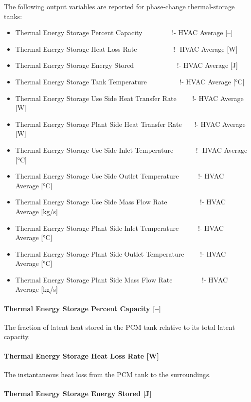 The following output variables are reported for phase‐change thermal‐storage tanks:

\begin{itemize}
\item
  Thermal Energy Storage Percent Capacity~~~~~~~~ !- HVAC Average [–]
\item
  Thermal Energy Storage Heat Loss Rate~~~~~~~~~~ !- HVAC Average [W]
\item
  Thermal Energy Storage Energy Stored~~~~~~~~~~~~ !- HVAC Average [J]
\item
  Thermal Energy Storage Tank Temperature~~~~~~~~~ !- HVAC Average [°C]
\item
  Thermal Energy Storage Use Side Heat Transfer Rate~~~~ !- HVAC Average [W]
\item
  Thermal Energy Storage Plant Side Heat Transfer Rate~~~ !- HVAC Average [W]
\item
  Thermal Energy Storage Use Side Inlet Temperature~~~~~~ !- HVAC Average [°C]
\item
  Thermal Energy Storage Use Side Outlet Temperature~~~~~ !- HVAC Average [°C]
\item
  Thermal Energy Storage Use Side Mass Flow Rate~~~~~~~~~ !- HVAC Average [kg/s]
\item
  Thermal Energy Storage Plant Side Inlet Temperature~~~~~ !- HVAC Average [°C]
\item
  Thermal Energy Storage Plant Side Outlet Temperature~~~~ !- HVAC Average [°C]
\item
  Thermal Energy Storage Plant Side Mass Flow Rate~~~~~~~~ !- HVAC Average [kg/s]
\end{itemize}

\paragraph{Thermal Energy Storage Percent Capacity [–]}\label{pcmstorage-percent-capacity}

The fraction of latent heat stored in the PCM tank relative to its total latent capacity.

\paragraph{Thermal Energy Storage Heat Loss Rate [W]}\label{pcmstorage-heat-loss-rate-output}

The instantaneous heat loss from the PCM tank to the surroundings.

\paragraph{Thermal Energy Storage Energy Stored [J]}\label{pcmstorage-energy-stored}

